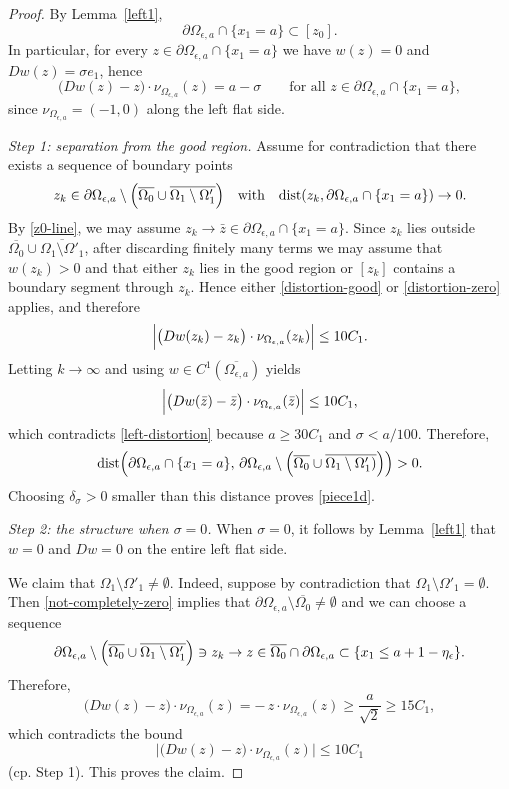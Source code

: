 \documentclass[reqno,11pt]{amsart}
\def\dist{{\mathop\mathrm{dist}}}
\numberwithin{equation}{section}
\theoremstyle{remark}
\begin{document}
\begin{proof}
By Lemma~\ref{left1},
\begin{equation}\label{z0-line}
\partial\Omega_{\epsilon,a}\cap\{x_1=a\}\subset [z_0].
\end{equation}
In particular, for every $z\in\partial\Omega_{\epsilon,a}\cap\{x_1=a\}$ we have $w(z)=0$ and $Dw(z)=\sigma e_1$, hence
\begin{equation}\label{left-distortion}
\bigl(Dw(z)-z\bigr)\cdot \nu_{\Omega_{\epsilon,a}}(z)=a-\sigma
\qquad\text{for all }z\in\partial\Omega_{\epsilon,a}\cap\{x_1=a\},
\end{equation}
since $\nu_{\Omega_{\epsilon,a}}=(-1,0)$ along the left flat side.

\smallskip
\noindent\emph{Step 1: separation from the good region.}
Assume for contradiction that there exists a sequence of boundary points
\[
z_k\in \partial\Omega_{\epsilon,a}\setminus\Bigl(\overline{\Omega_{0}}\cup\overline{\Omega_{1}\setminus\Omega'_{1}}\Bigr)
\quad\text{with}\quad \dist(z_k,\partial\Omega_{\epsilon,a}\cap\{x_1=a\})\to0.
\]
By \eqref{z0-line}, we may assume $z_k\to \bar z\in \partial\Omega_{\epsilon,a}\cap\{x_1=a\}$.
Since $z_k$ lies outside $\overline{\Omega_{0}}\cup\overline{\Omega_{1}\setminus\Omega'_{1}}$, after discarding finitely many terms we may assume that $w(z_k)>0$ and that either $z_k$ lies in the good region or $[z_k]$ contains a boundary segment through $z_k$.
Hence either \eqref{distortion-good} or \eqref{distortion-zero} applies, and therefore
\[
\Bigl|\bigl(Dw(z_k)-z_k\bigr)\cdot \nu_{\Omega_{\epsilon,a}}(z_k)\Bigr|\le 10C_1.
\]
Letting $k\to\infty$ and using $w\in C^1(\overline{\Omega_{\epsilon,a}})$ yields
\[
\Bigl|\bigl(Dw(\bar z)-\bar z\bigr)\cdot \nu_{\Omega_{\epsilon,a}}(\bar z)\Bigr|\le 10C_1,
\]
which contradicts \eqref{left-distortion} because $a\ge 30C_1$ and $\sigma<a/100$.
Therefore,
\[
\dist\!\left(\partial\Omega_{\epsilon,a}\cap\{x_1=a\},\,
\partial\Omega_{\epsilon,a}\setminus\Bigl(\overline{\Omega_{0}}\cup\overline{\Omega_{1}\setminus\Omega'_{1})}\Bigr)\right)>0.
\]
Choosing $\delta_\sigma>0$ smaller than this distance proves \eqref{piece1d}.

\smallskip
\noindent\emph{Step 2: the structure when $\sigma=0$.}
When $\sigma=0$, it follows by Lemma~\ref{left1} that $w=0$ and $Dw=0$ on the entire left flat side.

We claim that $\Omega_{1}\setminus\Omega'_{1}\neq\emptyset$.
Indeed, suppose by contradiction that $\Omega_{1}\setminus\Omega'_{1}=\emptyset$.
Then \eqref{not-completely-zero} implies that $
\partial\Omega_{\epsilon,a}\setminus \overline{\Omega_{0}}\neq\emptyset$ and 
we can choose a sequence
\[
\partial\Omega_{\epsilon,a}\setminus\Bigl(\overline{\Omega_{0}}\cup\overline{\Omega_{1}\setminus\Omega'_{1}}\Bigr)
\ni
z_k \to z \in \overline{\Omega_0}\cap \partial\Omega_{\epsilon,a}
\subset \{x_1\le a+1-\eta_\epsilon\}.
\]
Therefore,
\[
\bigl(Dw(z)-z\bigr)\cdot \nu_{\Omega_{\epsilon,a}}(z)
=
-\,z\cdot \nu_{\Omega_{\epsilon,a}}(z)
\ge \frac{a}{\sqrt2} \ge 15C_1,
\]
which contradicts the bound
\[
\bigl|\bigl(Dw(z)-z\bigr)\cdot \nu_{\Omega_{\epsilon,a}}(z)\bigr|\le 10C_1
\]
(cp. Step 1). This proves the claim.



\end{proof}
\end{document}
